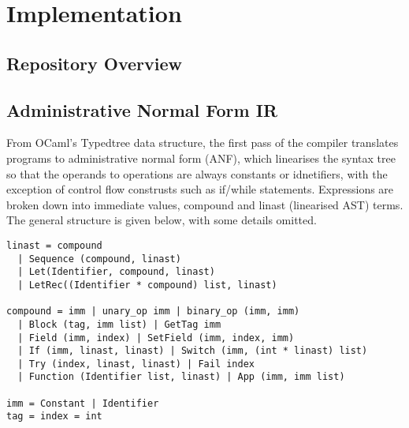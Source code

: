 \chapter{Implementation}

\section{Repository Overview}

\section{Administrative Normal Form IR}
From OCaml's Typedtree data structure, the first pass of the compiler translates programs to administrative normal form (ANF), which linearises the syntax tree so that the operands to operations are always constants or idnetifiers, with the exception of control flow construsts such as if/while statements. Expressions are broken down into immediate values, compound and linast (linearised AST) terms. The general structure is given below, with some details omitted.

\begin{verbatim}
linast = compound 
  | Sequence (compound, linast)
  | Let(Identifier, compound, linast) 
  | LetRec((Identifier * compound) list, linast)

compound = imm | unary_op imm | binary_op (imm, imm) 
  | Block (tag, imm list) | GetTag imm
  | Field (imm, index) | SetField (imm, index, imm)
  | If (imm, linast, linast) | Switch (imm, (int * linast) list)
  | Try (index, linast, linast) | Fail index
  | Function (Identifier list, linast) | App (imm, imm list)

imm = Constant | Identifier
tag = index = int
\end{verbatim}

